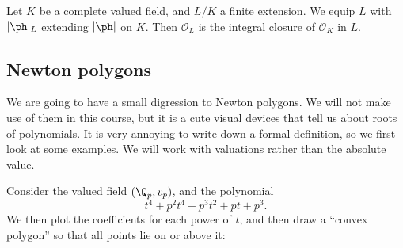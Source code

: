 \documentclass[a4paper]{article}
\begin{document}
\begin{cor}
  Let $K$ be a complete valued field, and $L/K$ a finite extension. We equip $L$ with $|\ph|_L$ extending $|\ph|$ on $K$. Then $\mathcal{O}_L$ is the integral closure of $\mathcal{O}_K$ in $L$.
\end{cor}

\subsection{Newton polygons}
We are going to have a small digression to Newton polygons. We will not make use of them in this course, but it is a cute visual devices that tell us about roots of polynomials. It is very annoying to write down a formal definition, so we first look at some examples. We will work with valuations rather than the absolute value.

\begin{eg}
  Consider the valued field $(\Q_p, v_p)$, and the polynomial
  \[
    t^4 + p^2 t^4 - p^3 t^2 + pt + p^3.
  \]
  We then plot the coefficients for each power of $t$, and then draw a ``convex polygon'' so that all points lie on or above it:
  \begin{center}
  \end{center}
\end{eg}
\end{document}
